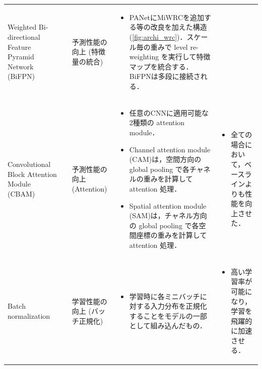 \documentclass[originalpaper,fleqn]{jsaiart}     %
\begin{document}
\begin{table}
\begin{center}
\begin{tabularx}{\linewidth}{Xp{1.5cm}Xp{7cm}X}
            Weighted Bi-directional Feature Pyramid Network (BiFPN)
            \vspace{0.7\baselineskip}
            & \cite{TPL20} & 予測性能の向上 (特徴量の統合) & 
            \begin{itemize}
                \vspace{-0.7\baselineskip}
                \setlength{\leftskip}{-3mm}
                \item PANetにMiWRCを追加する等の改良を加えた構造(\ref{fig:archi_wrc})．スケール毎の重みで level re-weighting を実行して特徴マップを統合する．BiFPNは多段に接続される．
            \end{itemize}
            &
            \\

            Convolutional Block Attention Module (CBAM) 
            & \cite{WPLK18} & 予測性能の向上 (Attention) & 
            \begin{itemize}
                \vspace{-0.7\baselineskip}
                \setlength{\leftskip}{-3mm}
                \item 任意のCNNに適用可能な2種類の attention module．
                \item Channel attention module (CAM)は，空間方向の global pooling で各チャネルの重みを計算して attention 処理．
                \item Spatial attention module (SAM)は，チャネル方向の global pooling で各空間座標の重みを計算して attention 処理． 
            \end{itemize}
            &
            \begin{itemize}
                \vspace{-0.7\baselineskip}
                \setlength{\leftskip}{-3mm}
                \item 全ての場合において，ベースラインよりも性能を向上させた．
            \end{itemize}
            \\

            Batch normalization
            & \cite{IoffeSzege15} & 学習性能の向上 (バッチ正規化) & 
            \begin{itemize}
                \vspace{-0.7\baselineskip}
                \setlength{\leftskip}{-3mm}
                \item 学習時に各ミニバッチに対する入力分布を正規化することをモデルの一部として組み込んだもの．
            \end{itemize}
            &
            \begin{itemize}
                \vspace{-0.7\baselineskip}
                \setlength{\leftskip}{-3mm}
                \item 高い学習率が可能になり，学習を飛躍的に加速させる．
            \end{itemize}
            \\


\end{tabularx}
\end{center}
\end{table}
\end{document}
